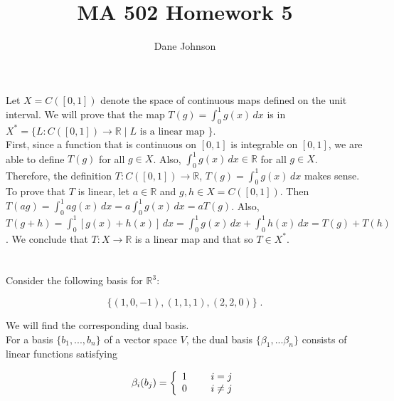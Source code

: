 \documentclass[11pt]{article}
\title{MA 502 Homework 5}
\author{Dane Johnson}
\begin{document}
\maketitle

\section{}

Let $X = C([0,1])$ denote the space of continuous maps defined on the unit interval. We will prove that the map $T(g) = \int_{0}^{1} g(x) \, dx$ is in $X^* = \{L : C([0,1]) \rightarrow \mathbb{R} \; | \; L \text{ is a linear map }\}$. \\


First, since a function that is continuous on $[0,1]$ is integrable on $[0,1]$, we are able to define $T(g)$ for all $g \in X$. Also, $\int_{0}^{1} g(x) \, dx \in \mathbb{R}$ for all $g \in X$. Therefore, the definition $T : C([0,1]) \rightarrow \mathbb{R}$, $T(g) = \int_{0}^{1} g(x) \, dx$ makes sense. To prove that $T$ is linear, let $a \in \mathbb{R}$ and $g,h \in X = C([0,1])$. Then $T(ag) = \int_{0}^{1} ag(x) \, dx = a\int_{0}^{1} g(x) \, dx = aT(g)$. Also, $T(g+h) = \int_{0}^{1} [g(x) + h(x)] \, dx = \int_{0}^{1} g(x) \, dx + \int_{0}^{1} h(x) \, dx = T(g) + T(h)$. We conclude that $T : X \rightarrow \mathbb{R}$ is a linear map and that so $T \in X^*$. 

\section{}

Consider the following basis for $\mathbb{R}^3$:

$$ \{(1,0,-1), (1,1,1), (2,2,0)\} \;. $$

We will find the corresponding dual basis. \\

For a basis $\{b_1,...,b_n\}$ of a vector space $V$, the dual basis $\{\beta_1,...\beta_n\}$ consists of linear functions satisfying

\begin{align*}
\beta_i(b_j) = \left\{ \begin{array}{cc} 
                1 & \hspace{5mm} i=j \\
                0 & \hspace{5mm} i\neq j \\
                \end{array} \right.
\end{align*}
\end{document}
